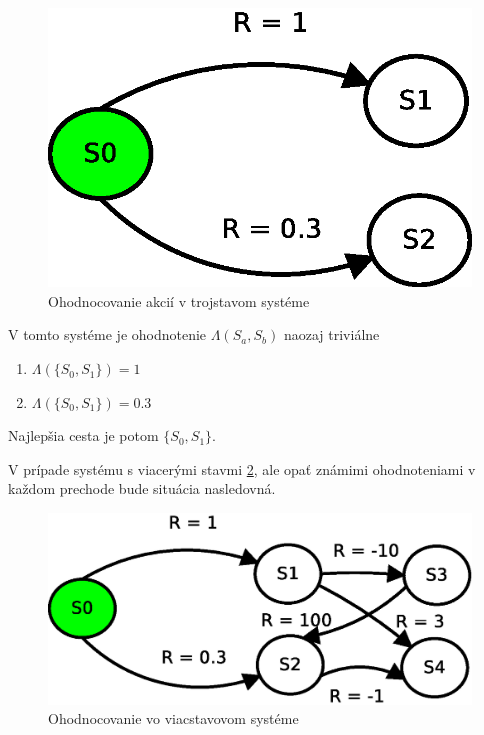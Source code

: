 \begin{figure}[!htb]
\centering
\includegraphics[scale=.6]{../diagrams/rf_two_states.eps}
\caption{Ohodnocovanie akcií v trojstavom systéme}
\label{img:three_states_system}
\end{figure}

V tomto systéme je ohodnotenie $\Lambda(S_a, S_b)$ naozaj triviálne

\begin{enumerate}
  \item $\Lambda(\{S_0, S_1\}) = 1$
  \item $\Lambda(\{S_0, S_1\}) = 0.3$
\end{enumerate}

Najlepšia cesta je potom $\{S_0, S_1\}$.

V prípade systému s viacerými stavmi \ref{img:multiple_states_system}, ale
opať známimi ohodnoteniami v každom prechode bude situácia nasledovná.

\begin{figure}[!htb]
\centering
\includegraphics[scale=.6]{../diagrams/rf_more_states.eps}
\caption{Ohodnocovanie vo viacstavovom systéme}
\label{img:multiple_states_system}
\end{figure}


